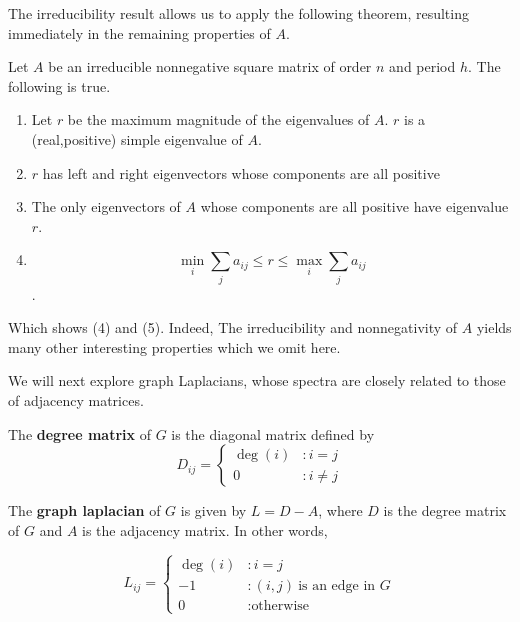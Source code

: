 The irreducibility result allows us to apply the following theorem, resulting
immediately in the remaining properties of $A$.

\begin{theorem}
  Let $A$ be an irreducible nonnegative square matrix of order $n$ and period
  $h$. The following is true.

  \begin{enumerate}
  \item Let $r$ be the maximum magnitude of the eigenvalues of $A$. $r$ is a
    (real,positive) simple eigenvalue of $A$.
  \item $r$ has left and right eigenvectors whose components are all positive
  \item The only eigenvectors of $A$ whose components are all positive have
    eigenvalue $r$.
  \item
    \[ \min_i \sum_j a_{ij} \leq r \leq \max_i \sum_j a_{ij} \].
  \end{enumerate}
\end{theorem}


Which shows (4) and (5). Indeed, The irreducibility and nonnegativity of $A$
yields many other interesting properties which we omit here.

We will next explore graph Laplacians, whose spectra are closely related to
those of adjacency matrices.

\begin{definition}
  The \textbf{degree matrix} of $G$ is the diagonal matrix defined by
  \[
    D_{ij} = \begin{cases}
      \deg(i) &: i = j \\
      0 &: i \neq j
    \end{cases}
  \]
\end{definition}

\begin{definition}
  The \textbf{graph laplacian} of $G$ is given by $L = D - A$, where $D$ is the
  degree matrix of $G$ and $A$ is the adjacency matrix. In other words,

  \[
    L_{ij} = \begin{cases}
      \deg(i) &: i=j \\
      -1 &: (i,j) ~\text{is an edge in $G$} \\
      0 &: \text{otherwise}
    \end{cases}
  \]
\end{definition}



